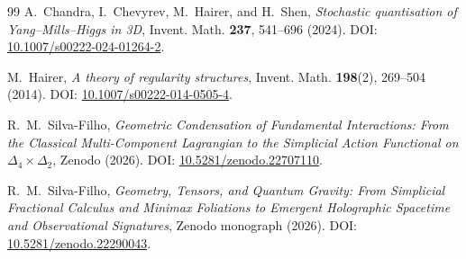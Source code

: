 \documentclass[11pt,a4paper]{amsart}
\theoremstyle{definition}
\begin{document}
\begin{thebibliography}{99}
A.~Chandra, I.~Chevyrev, M.~Hairer, and H.~Shen, \emph{Stochastic quantisation of Yang--Mills--Higgs in 3D}, Invent. Math. \textbf{237}, 541--696 (2024). DOI: \href{https://doi.org/10.1007/s00222-024-01264-2}{10.1007/s00222-024-01264-2}.

M.~Hairer, \emph{A theory of regularity structures}, Invent. Math. \textbf{198}(2), 269--504 (2014). DOI: \href{https://doi.org/10.1007/s00222-014-0505-4}{10.1007/s00222-014-0505-4}.

R.~M.~Silva-Filho, \emph{Geometric Condensation of Fundamental Interactions: From the Classical Multi-Component Lagrangian to the Simplicial Action Functional on $\Delta_4 \times \Delta_2$}, Zenodo (2026). DOI: \href{https://doi.org/10.5281/zenodo.22707110}{10.5281/zenodo.22707110}.

R.~M.~Silva-Filho, \emph{Geometry, Tensors, and Quantum Gravity: From Simplicial Fractional Calculus and Minimax Foliations to Emergent Holographic Spacetime and Observational Signatures}, Zenodo monograph (2026). DOI: \href{https://doi.org/10.5281/zenodo.22290043}{10.5281/zenodo.22290043}.

\end{thebibliography}
\end{document}
